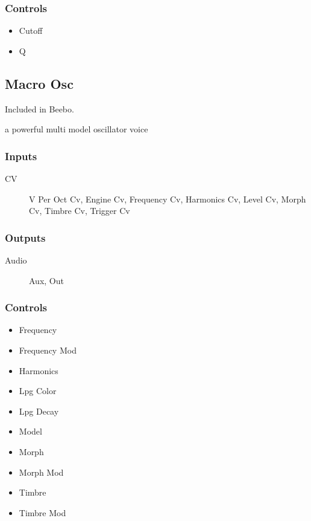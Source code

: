 \subsubsection{Controls}
\begin{itemize}
\item Cutoff
\item Q
\end{itemize}

\subsection{Macro Osc}

Included in Beebo.

a powerful multi model oscillator voice



\subsubsection{Inputs}
\begin{description}
\item [CV] V Per Oct Cv, Engine Cv, Frequency Cv, Harmonics Cv, Level Cv, Morph Cv, Timbre Cv, Trigger Cv
\end{description}

\subsubsection{Outputs}
\begin{description}
\item [Audio] Aux, Out
\end{description}

\subsubsection{Controls}
\begin{itemize}
\item Frequency
\item Frequency Mod
\item Harmonics
\item Lpg Color
\item Lpg Decay
\item Model
\item Morph
\item Morph Mod
\item Timbre
\item Timbre Mod
\end{itemize}

